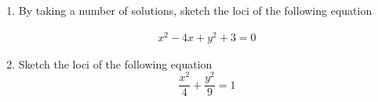 \renewcommand{\theequation}{\theenumi}
\renewcommand{\thefigure}{\theenumi}
\begin{enumerate}[label=\thesubsection.\arabic*.,ref=\thesubsection.\theenumi]

\item By taking a number of solutions, sketch
the loci of the following equation

\begin{align}\label{4/4/eq:eq1}
    x^{2}-4x +y^{2}+3=0
\end{align}

\solution



\item Sketch the loci of the following equation
\begin{equation}
\label{4/7/Eq a}
\frac{x^2}{4} + \frac{y^2}{9} = 1
\end{equation}
%
\solution

\end{enumerate}

